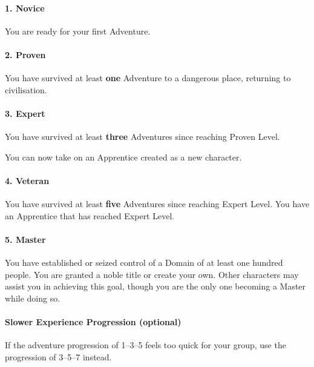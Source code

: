 \documentclass[itdr]{subfiles}
\begin{document}
\vfill
\paragraph{1. Novice}
You are ready for your first Adventure.

\vfill
\paragraph{2. Proven}
You have survived at least \textbf{one} Adventure to a dangerous place, returning to civilisation.

\vfill
\paragraph{3. Expert}
You have survived at least \textbf{three} Adventures since reaching Proven Level.

You can now take on an Apprentice created as a new character.

\vfill
\paragraph{4. Veteran}
You have survived at least \textbf{five} Adventures since reaching Expert Level. You have an Apprentice that has reached Expert Level.

\vfill
\paragraph{5. Master}
You have established or seized control of a Domain of at least one hundred people. You are granted a noble title or create your own. Other characters may assist you in achieving this goal, though you are the only one becoming a Master while doing so.

\vfill

\begin{dbox}
	\paragraph{Slower Experience Progression (optional)}
	If the adventure progression of 1--3--5 feels too quick for your group, use the progression of 3--5--7 instead.
\end{dbox}

\vfill
\end{document}

